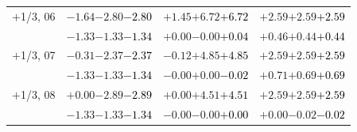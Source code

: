 \documentclass[compress]{beamer}
\begin{document}
\begin{frame}
\begin{tabular}{r | c | c | c}
$+$1/3, 06 & $-1.64$\hspace{0.1 cm}$-2.80$\hspace{0.1 cm}\textcolor{black}{$-2.80$} & $+1.45$\hspace{0.1 cm}$+6.72$\hspace{0.1 cm}\textcolor{black}{$+6.72$} & $+2.59$\hspace{0.1 cm}$+2.59$\hspace{0.1 cm}\textcolor{black}{$+2.59$} \\
           & $-1.33$\hspace{0.1 cm}$-1.33$\hspace{0.1 cm}\textcolor{black}{$-1.34$} & $+0.00$\hspace{0.1 cm}$-0.00$\hspace{0.1 cm}\textcolor{black}{$+0.04$} & $+0.46$\hspace{0.1 cm}$+0.44$\hspace{0.1 cm}\textcolor{black}{$+0.44$} \\
$+$1/3, 07 & $-0.31$\hspace{0.1 cm}$-2.37$\hspace{0.1 cm}\textcolor{black}{$-2.37$} & $-0.12$\hspace{0.1 cm}$+4.85$\hspace{0.1 cm}\textcolor{black}{$+4.85$} & $+2.59$\hspace{0.1 cm}$+2.59$\hspace{0.1 cm}\textcolor{black}{$+2.59$} \\
           & $-1.33$\hspace{0.1 cm}$-1.33$\hspace{0.1 cm}\textcolor{black}{$-1.34$} & $-0.00$\hspace{0.1 cm}$+0.00$\hspace{0.1 cm}\textcolor{black}{$-0.02$} & $+0.71$\hspace{0.1 cm}$+0.69$\hspace{0.1 cm}\textcolor{black}{$+0.69$} \\
$+$1/3, 08 & $+0.00$\hspace{0.1 cm}$-2.89$\hspace{0.1 cm}\textcolor{black}{$-2.89$} & $+0.00$\hspace{0.1 cm}$+4.51$\hspace{0.1 cm}\textcolor{black}{$+4.51$} & $+2.59$\hspace{0.1 cm}$+2.59$\hspace{0.1 cm}\textcolor{black}{$+2.59$} \\
           & $-1.33$\hspace{0.1 cm}$-1.33$\hspace{0.1 cm}\textcolor{black}{$-1.34$} & $-0.00$\hspace{0.1 cm}$-0.00$\hspace{0.1 cm}\textcolor{black}{$+0.00$} & $+0.00$\hspace{0.1 cm}$-0.02$\hspace{0.1 cm}\textcolor{black}{$-0.02$} \\

\end{tabular}
\end{frame}
\end{document}
